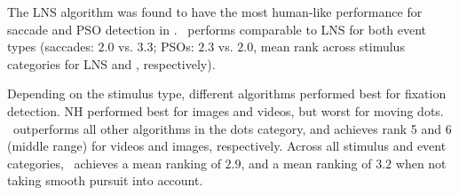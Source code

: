 The LNS algorithm \citep{Larsson2013} was found to have the most human-like
performance for saccade and PSO detection in \cite{Andersson2017}.  \remodnav\
performs comparable to LNS for both event types (saccades: $2.0$ vs. $3.3$;
PSOs: $2.3$ vs. $2.0$, mean rank across stimulus categories for LNS and \remodnav,
respectively).

Depending on the stimulus type, different algorithms performed best for
fixation detection. NH performed best for images and videos, but worst for
moving dots. \remodnav\ outperforms all other algorithms in the dots category,
and achieves rank 5 and 6 (middle range) for videos and images, respectively.
Across all stimulus and event categories, \remodnav\ achieves a mean ranking
of $2.9$, and a mean ranking of $3.2$ when not taking smooth pursuit into account.

